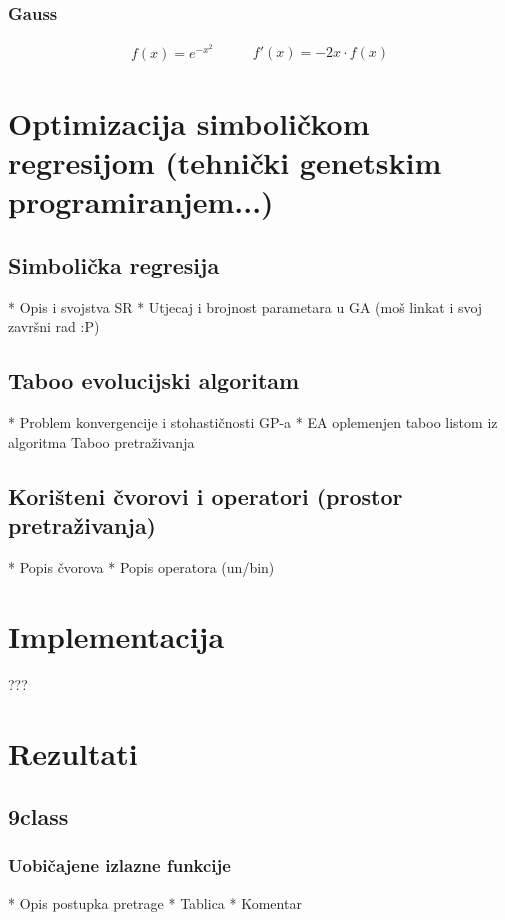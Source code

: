 \documentclass[times, utf8, diplomski]{fer}
\begin{document}
\subsection*{Gauss}
\begin{equation}
\begin{split}
f(x) = e^{-x^2}
\end{split}
\qquad
\begin{split}
f'(x) = -2x \cdot f(x)
\end{split}
\end{equation}

\chapter{Optimizacija simboličkom regresijom (tehnički genetskim programiranjem...)}

\section{Simbolička regresija}
* Opis i svojstva SR
* Utjecaj i brojnost parametara u GA (moš linkat i svoj završni rad :P)

\section{Taboo evolucijski algoritam}
* Problem konvergencije i stohastičnosti GP-a
* EA oplemenjen taboo listom iz algoritma Taboo pretraživanja

\section{Korišteni čvorovi i operatori (prostor pretraživanja)}
* Popis čvorova
* Popis operatora (un/bin)

\chapter{Implementacija}
???

\chapter{Rezultati}

\section{9class}

\subsection{Uobičajene izlazne funkcije}
* Opis postupka pretrage
* Tablica
* Komentar
\end{document}
